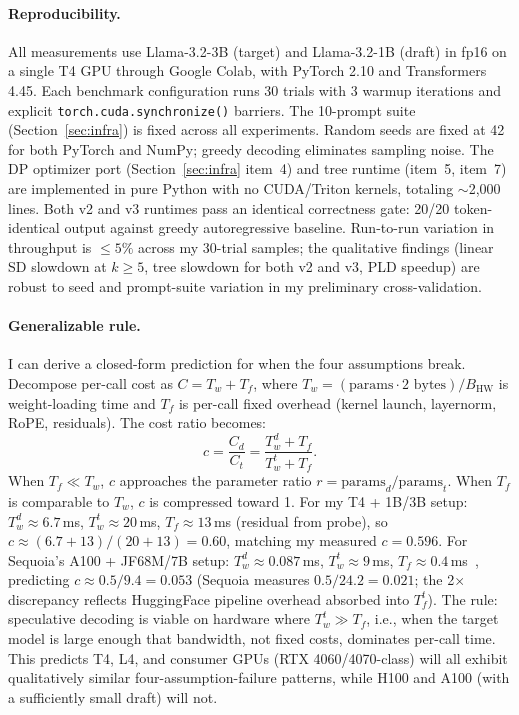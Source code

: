 \documentclass[letterpaper,twocolumn,10pt]{article}
\begin{document}
\paragraph{Reproducibility.}
All measurements use Llama-3.2-3B (target) and Llama-3.2-1B (draft) in fp16 on a single T4 GPU through Google Colab, with PyTorch 2.10 and Transformers 4.45.
Each benchmark configuration runs 30 trials with 3 warmup iterations and explicit \texttt{torch.cuda.synchronize()} barriers.
The 10-prompt suite (Section~\ref{sec:infra}) is fixed across all experiments.
Random seeds are fixed at 42 for both PyTorch and NumPy; greedy decoding eliminates sampling noise.
The DP optimizer port (Section~\ref{sec:infra} item~4) and tree runtime (item~5, item~7) are implemented in pure Python with no CUDA/Triton kernels, totaling $\sim$2{,}000 lines.
Both v2 and v3 runtimes pass an identical correctness gate: 20/20 token-identical output against greedy autoregressive baseline.
Run-to-run variation in throughput is $\le 5\%$ across my 30-trial samples; the qualitative findings (linear SD slowdown at $k\geq 5$, tree slowdown for both v2 and v3, PLD speedup) are robust to seed and prompt-suite variation in my preliminary cross-validation.

\paragraph{Generalizable rule.}
I can derive a closed-form prediction for when the four assumptions break.
Decompose per-call cost as $C = T_w + T_f$, where $T_w = (\text{params} \cdot 2 \text{ bytes})/B_{\text{HW}}$ is weight-loading time and $T_f$ is per-call fixed overhead (kernel launch, layernorm, RoPE, residuals).
The cost ratio becomes:
\[
c = \frac{C_d}{C_t} = \frac{T_w^d + T_f}{T_w^t + T_f}.
\]
When $T_f \ll T_w$, $c$ approaches the parameter ratio $r = \text{params}_d/\text{params}_t$.
When $T_f$ is comparable to $T_w$, $c$ is compressed toward 1.
For my T4 + 1B/3B setup: $T_w^d \approx 6.7$\,ms, $T_w^t \approx 20$\,ms, $T_f \approx 13$\,ms (residual from probe), so $c \approx (6.7+13)/(20+13) = 0.60$, matching my measured $c=0.596$.
For Sequoia's A100 + JF68M/7B setup: $T_w^d \approx 0.087$\,ms, $T_w^t \approx 9$\,ms, $T_f \approx 0.4$\,ms~\cite{chen2024sequoia}, predicting $c \approx 0.5/9.4 = 0.053$ (Sequoia measures $0.5/24.2 = 0.021$; the 2$\times$ discrepancy reflects HuggingFace pipeline overhead absorbed into $T_f^t$).
The rule: speculative decoding is viable on hardware where $T_w^t \gg T_f$, i.e., when the target model is large enough that bandwidth, not fixed costs, dominates per-call time.
This predicts T4, L4, and consumer GPUs (RTX 4060/4070-class) will all exhibit qualitatively similar four-assumption-failure patterns, while H100 and A100 (with a sufficiently small draft) will not.
\end{document}
